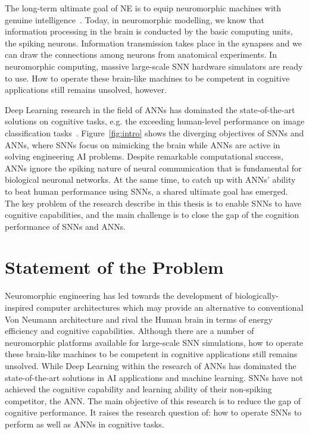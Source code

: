 The long-term ultimate goal of NE is to equip neuromorphic machines with genuine intelligence~\cite{konar1999artificial}.
Today, in neuromorphic modelling, we know that information processing in the brain is conducted by the basic computing units, the spiking neurons.
Information transmission takes place in the synapses and we can draw the connections among neurons from anatomical experiments.
In neuromorphic computing, massive large-scale SNN hardware simulators are ready to use.
How to operate these brain-like machines to be competent in cognitive applications still remains unsolved, however.

Deep Learning research in the field of ANNs has dominated the state-of-the-art solutions on cognitive tasks, e.g. the exceeding human-level performance on image classification tasks~\cite{he2015delving}.
Figure~\ref{fig:intro} shows the diverging objectives of SNNs and ANNs, where SNNs focus on mimicking the brain while ANNs are active in solving engineering AI problems.
Despite remarkable computational success, ANNs ignore the spiking nature of neural communication that is fundamental for biological neuronal networks.
At the same time, to catch up with ANNs' ability to beat human performance using SNNs, a shared ultimate goal has emerged.
The key problem of the research describe in this thesis is to enable SNNs to have cognitive capabilities, and the main challenge is to close the gap of the cognition performance of SNNs and ANNs.




\section{Statement of the Problem}
\label{sec:state_problem}
Neuromorphic engineering has led towards the development of biologically-inspired computer architectures which may provide an alternative to conventional Von Neumann architecture and rival the Human brain in terms of energy efficiency and cognitive capabilities.
Although there are a number of neuromorphic platforms available for large-scale SNN simulations, how to operate these brain-like machines to be competent in cognitive applications still remains unsolved.
While Deep Learning within the research of ANNs has dominated the state-of-the-art solutions in AI applications and machine learning.
SNNs have not achieved the cognitive capability and learning ability of their non-spiking competitor, the ANN.
The main objective of this research is to reduce the gap of cognitive performance.
It raises the research question of: how to operate SNNs to perform as well as ANNs in cognitive tasks.

